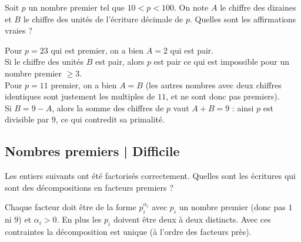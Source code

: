 \begin{question}
 Soit $p$ un nombre premier tel que $10 < p < 100$. On note $A$ le chiffre des dizaines et $B$ le chiffre des unités de l'écriture décimale de $p$. Quelles sont les affirmations vraies ?
    \begin{answers} 
    \end{answers}
    \begin{explanations}
    Pour $p = 23$ qui est premier, on a bien $A = 2$ qui est pair.\\ 
    Si le chiffre des unités $B$ est pair, alors $p$ est pair ce qui est impossible pour un nombre premier $\geq 3$.\\    
    Pour $p=11$ premier, on a bien $A=B$ (les autres nombres avec deux chiffres identiques sont justement les multiples de $11$, et ne sont donc pas premiers).\\    
    Si $B = 9-A$, alors la somme des chiffres de $p$ vaut $A + B = 9$ : ainsi $p$ est divisible par $9$, ce qui contredit sa primalité.
    \end{explanations}
\end{question}


\subsection{Nombres premiers | Difficile}


\begin{question}
    Les entiers suivants ont été factorisés correctement. 
    Quelles sont les écritures qui sont des décompositions en facteurs premiers ?
    \begin{answers} 
    \end{answers}
    \begin{explanations} 
    Chaque facteur doit être de la forme $p_i^{\alpha_i}$ avec $p_i$ un nombre premier (donc pas $1$ ni $9$) et $\alpha_i>0$. En plus les $p_i$ doivent être deux à deux distincts. Avec ces contraintes la décomposition est unique (à l'ordre des facteurs près).
    \end{explanations}
\end{question}


